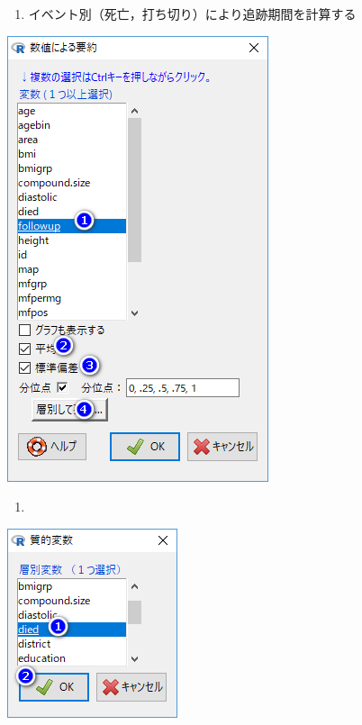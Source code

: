 \documentclass[11pt,]{problemset}
\providecommand{\tightlist}{%
  \setlength{\itemsep}{0pt}\setlength{\parskip}{0pt}}
\begin{document}
\begin{enumerate}
\def\labelenumi{\arabic{enumi}.}
\setcounter{enumi}{3}
\tightlist
\item
  イベント別（死亡，打ち切り）により追跡期間を計算する
\end{enumerate}

\begin{center}\includegraphics[width=0.55\linewidth,height=0.35\textheight]{pic/survival03} \end{center}

\newpage

\begin{enumerate}
\def\labelenumi{\arabic{enumi}.}
\setcounter{enumi}{4}
\item
\end{enumerate}

\begin{center}\includegraphics[width=0.25\linewidth,height=0.35\textheight]{pic/survival04} \end{center}
\end{document}
